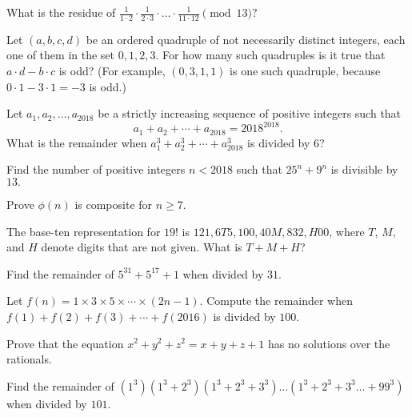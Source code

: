 \documentclass{article}
\begin{document}
\begin{prob}[]{2}
What is the residue of $\frac{1}{1\cdot 2}\cdot \frac{1}{2\cdot 3}\cdot \dots \cdot \frac{1}{11\cdot 12}\pmod {13}?$
\end{prob}

\begin{req}[AMC 10A 2020/18]{2}
Let $(a,b,c,d)$ be an ordered quadruple of not necessarily distinct integers, each one of them in the set ${0,1,2,3}.$ For how many such quadruples is it true that $a\cdot d-b\cdot c$ is odd? (For example, $(0,3,1,1)$ is one such quadruple, because $0\cdot 1-3\cdot 1 = -3$ is odd.)
\end{req}

\begin{prob}[AMC 10B 2018/16]{3}
Let $a_1,a_2,\dots,a_{2018}$ be a strictly increasing sequence of positive integers such that\[a_1+a_2+\cdots+a_{2018}=2018^{2018}.\]What is the remainder when $a_1^3+a_2^3+\cdots+a_{2018}^3$ is divided by $6$?
\end{prob}

\begin{prob}[PUMaC 2018]{3}
Find the number of positive integers $n<2018$ such that $25^n+9^n$ is divisible by $13.$
\end{prob}

\begin{prob}[]{3}
Prove $\phi(n)$ is composite for $n\geq 7.$
\end{prob}

\begin{prob}[AMC 10B 2019/14]{3}
The base-ten representation for $19!$ is $121,6T5,100,40M,832,H00$, where $T$, $M$, and $H$ denote digits that are not given. What is $T+M+H$?
\end{prob}
    
\begin{prob}[]{4}
Find the remainder of $5^{31}+5^{17}+1$ when divided by $31.$
\end{prob}

\begin{prob}{4}
Let $f(n)=1 \times 3 \times 5 \times \cdots \times (2n-1)$. Compute the remainder when $f(1)+f(2)+f(3)+\cdots +f(2016)$ is divided by $100.$
\end{prob}

\begin{prob}[]{4}
Prove that the equation $x^2+y^2+z^2=x+y+z+1$ has no solutions over the rationals.
\end{prob}

\begin{req}{4}
Find the remainder of $(1^3)(1^3+2^3)(1^3+2^3+3^3)\dots(1^3+2^3+3^3\dots+99^3)$ when divided by $101.$
\end{req}
\end{document}
